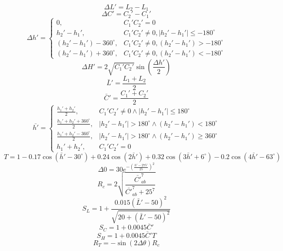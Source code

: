 \begin{equation}
\Delta L'=L_{2}-L_{1}
\end{equation}
\begin{equation}
\Delta C'=C_{2}'-C_{1}'
\end{equation}
\begin{equation}
\Delta h' =
\begin{cases}
0, & C_{1}'C_{2}'=0\\
h_{2}'-h_{1}', & C_{1}'C_{2}'\ne 0, |h_{2}'-h_{1}'| \leq -180^{\circ}\\
(h_{2}'-h_{1}')-360^{\circ}, & C_{1}'C_{2}'\neq 0, (h_{2}'-h_{1}') > -180^{\circ}\\
(h_{2}'-h_{1}')+360^{\circ}, & C_{1}'C_{2}'\neq 0, (h_{2}'-h_{1}') < -180^{\circ}
\end{cases}
\end{equation}
\begin{equation}
\Delta H'=2\sqrt{C_{1}'C_{2}' } \sin\left(\frac{\Delta h'}{2}\right)
\end{equation}
\begin{equation}
\bar{L}'=\frac{L_{1}+L_{2}}{2}
\end{equation}
\begin{equation}
\bar{C}'=\frac{C_{1}'+C_{2}'}{2}
\end{equation}
\begin{equation}
\bar{h'} =
\begin{cases}
\frac{h_{1}'+h_{2}'}{2}, & C_{1}'C_{2}'\neq 0 \wedge |h_{2}'-h_{1}'| \leq 180^{\circ}\\
\frac{h_{1}'+h_{2}'+360^{\circ}}{2}, & |h_{2}'-h_{1}'| > 180^{\circ} \wedge (h_{2}'-h_{1}') < 180^{\circ}\\
\frac{h_{1}'+h_{2}'-360^{\circ}}{2}, & |h_{2}'-h_{1}'| > 180^{\circ} \wedge (h_{2}'-h_{1}') \geq 360^{\circ}\\
h_{1}'+h_{2}', & C_{1}'C_{2}'=0
\end{cases}
\end{equation}
\begin{equation}
T=1-0.17 \cos(\bar{h}'-30^{\circ})+0.24 \cos(2\bar{h}')+0.32\cos(3\bar{h}'+6^{\circ})-0.2 \cos(4\bar{h}'-63^{\circ})
\end{equation}
\begin{equation}
\Delta 0 = 30e^{-(\frac{h'-275^{\circ}}{25})^{2}}
\end{equation} 
\begin{equation}
R_{c}=2\sqrt{\frac{\bar{C'}_{ab}^{7}}{\bar{C'}_{ab}^{7}+25^{7}}}
\end{equation}
\begin{equation}
S_{L}=1+\frac{0.015(\bar{L}'-50)^{2}}{\sqrt{20+(\bar{L}'-50)^{2}}}
\end{equation}
\begin{equation}
S_{C}=1+0.0045\bar{C}'
\end{equation}
\begin{equation}
S_{H}=1+0.0045\bar{C}'T
\end{equation}
\begin{equation}
R_{T}=-\sin(2 \Delta \theta)R_{c}
\end{equation}